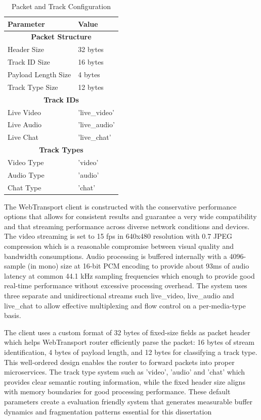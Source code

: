 \begin{table}[h!]
\centering
\caption{Packet and Track Configuration}
\label{tab:packet-track-config}
\renewcommand{\arraystretch}{1.3}
\begin{tabular}{|l|l|}
\hline
\textbf{Parameter} & \textbf{Value} \\
\hline
\multicolumn{2}{|c|}{\textbf{Packet Structure}} \\
\hline
Header Size & 32 bytes \\
\hline
Track ID Size & 16 bytes \\
\hline
Payload Length Size & 4 bytes \\
\hline
Track Type Size & 12 bytes \\
\hline
\multicolumn{2}{|c|}{\textbf{Track IDs}} \\
\hline
Live Video & 'live\_video' \\
\hline
Live Audio & 'live\_audio' \\
\hline
Live Chat & 'live\_chat' \\
\hline

\multicolumn{2}{|c|}{\textbf{Track Types}} \\
\hline
Video Type & 'video' \\
\hline
Audio Type & 'audio' \\
\hline
Chat Type & 'chat' \\
\hline
\end{tabular}
\end{table}

The WebTransport client is constructed with the conservative performance options that allows for consistent results and guarantee a very wide compatibility and that streaming performance across diverse network conditions and devices. The video streaming is set to 15 fps in 640x480 resolution with 0.7 JPEG compression which is a reasonable compromise between visual quality and bandwidth consumptions. Audio processing is buffered internally with a 4096-sample (in mono) size at 16-bit PCM encoding to provide about 93ms of audio latency at common 44.1 kHz sampling frequencies which enough to provide good real-time performance without excessive processing overhead. The system uses three separate and unidirectional streams such live\_video, live\_audio and live\_chat to allow effective multiplexing and flow control on a per-media-type basis.

The client uses a custom format of 32 bytes of fixed-size fields as packet header which helps WebTransport router efficiently parse the packet: 16 bytes of stream identification, 4 bytes of payload length, and 12 bytes for classifying a track type. This well-ordered design enables the router to forward packets into proper microservices. The track type system such as 'video', 'audio' and 'chat' which provides clear semantic routing information, while the fixed header size aligns with memory boundaries for good processing performance. These default parameters create a evaluation friendly system that generates measurable buffer dynamics and fragmentation patterns essential for this dissertation

